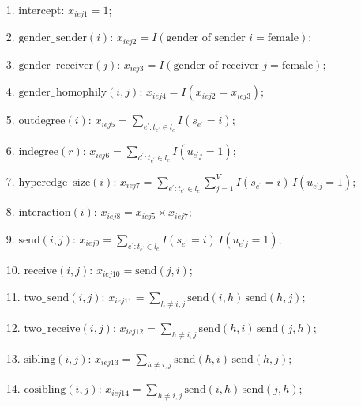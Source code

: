 \documentclass[ba]{imsart}
\numberwithin{equation}{section}
\theoremstyle{plain}
\begin{document}
	\begin{itemize}
		\item[1.] intercept: ${x}_{iej1} =1$;
		\item[2.] $\mbox{gender}\_\,\mbox{sender}(i)$: ${x}_{iej2} = I(\mbox{gender of sender } i= \mbox{female});$
		\item[3.] $\mbox{gender}\_\,\mbox{receiver}(j)$: ${x}_{iej3} = I(\mbox{gender of receiver } j= \mbox{female});$
		\item[4.] $\mbox{gender}\_\,\mbox{homophily}(i, j)$: ${x}_{iej4} = I({x}_{iej2}={x}_{iej3});$ 	   		
		\item[5.] $\mbox{outdegree}(i)$: ${x}_{iej5} =\sum_{e^\prime: t_{e^\prime} \in l_e} I(s_{e^\prime} = i)$;
		\item[6.] $\mbox{indegree}(r)$: ${x}_{iej6}=\sum_{d^\prime: t_{e^\prime} \in l_e} I(u_{e^\prime j} = 1)$;
		\item[7.] $\mbox{hyperedge}\_\,\mbox{size}(i)$: ${x}_{iej7}=\sum_{e^\prime: t_{e^\prime} \in l_e} \sum_{j=1}^V I(s_{e^\prime} = i)\,I(u_{e^\prime j} = 1)$;
		\item[8.] $\mbox{interaction}(i)$: ${x}_{iej8} = {x}_{iej5}\times{x}_{iej7};$
		\item[9.] $\mbox{send}(i, j)$: ${x}_{iej9}=\sum_{e^\prime: t_{e^\prime} \in l_e} I(s_{e^\prime} = i)\,I(u_{e^\prime j} = 1)$;
		\item[10.] $\mbox{receive}(i,j)$: ${x}_{iej10}=\mbox{send}(j,i)$;
		\item[11.] $\mbox{two}\_\,\mbox{send}(i,j)$: ${x}_{iej11} = \sum_{h \neq i,j} \mbox{send}(i,h)\,\mbox{send}(h,j)$;
		\item[12.] $\mbox{two}\_\,\mbox{receive}(i,j)$: ${x}_{iej12}= \sum_{h \neq i, j} \mbox{send}(h,i)\,\mbox{send}(j,h)$;
		\item[13.] $\mbox{sibling}(i, j)$: ${x}_{iej13}=\sum_{h \neq i, j} \mbox{send}(h,i)\,\mbox{send}(h,j)$;
		\item[14.] $\mbox{cosibling}(i, j)$: ${x}_{iej14}=\sum_{h \neq i,j} \mbox{send}(i,h)\,\mbox{send}(j,h)$;
	\end{itemize}
\end{document}
